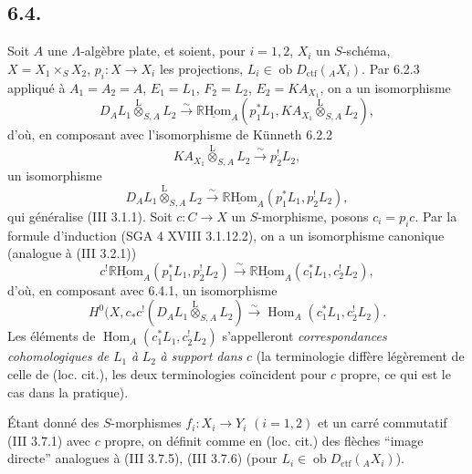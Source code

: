 \documentclass[11pt]{article}
\DeclareMathOperator{\Hom}{Hom}
\newcommand{\R}{\mathbb{R}}\newcommand{\RHomCore}{\mathbb{R}\mathrm{Hom}}
\providecommand{\RHom}{\RHomCore}
\providecommand{\uRHom}{\underline{\RHom}}
\providecommand{\lten}{\overset{\mathrm L}{\otimes}}
\providecommand{\Ob}{\operatorname{ob}}
\providecommand{\RHom}{\RHomCore}
\providecommand{\Hom}{\operatorname{Hom}}
\providecommand{\lten}{\overset{\mathrm L}{\otimes}}
\providecommand{\RHom}{\R\mathcal{H}om}
\providecommand{\lten}{\overset{\mathrm L}{\otimes}}
\providecommand{\Ob}{\operatorname{ob}}
\providecommand{\R}{\mathrm R}
\providecommand{\lten}{\overset{\mathrm L}{\otimes}}
\providecommand{\lten}{\overset{\mathrm L}{\otimes}}
\providecommand{\Ob}{\operatorname{Ob}}
\providecommand{\lten}{\overset{\mathrm L}{\otimes}}
\providecommand{\RHom}{\RHomCore}
\providecommand{\Hom}{\operatorname{Hom}}
\providecommand{\Ob}{\operatorname{ob}}
\providecommand{\Ob}{\operatorname{Ob}}
\providecommand{\lten}{\overset{\mathrm L}{\otimes}}
\begin{document}
\subsection*{6.4.}
Soit $A$ une $\Lambda$-algèbre plate, et soient, pour $i=1,2$, $X_i$ un $S$-schéma, $X=X_1\times_SX_2$, $p_i:X\to X_i$ les projections, $L_i\in\Ob D_{\mathrm{ctf}}({}_AX_i)$. Par 6.2.3 appliqué à $A_1=A_2=A$, $E_1=L_1$, $F_2=L_2$, $E_2=KA_{X_1}$, on a un isomorphisme
\[
D_A L_1\lten_{S,A}L_2
\xrightarrow{\sim}
\uRHom_A(p_1^*L_1,KA_{X_1}\lten_{S,A}L_2),
\]
d'où, en composant avec l'isomorphisme de Künneth 6.2.2
\[
KA_{X_1}\lten_{S,A}L_2\xrightarrow{\sim}p_2^!L_2,
\]
un isomorphisme
\begin{equation}
D_AL_1\lten_{S,A}L_2
\xrightarrow{\sim}
\uRHom_A(p_1^*L_1,p_2^!L_2),
\tag{6.4.1}
\end{equation}
qui généralise (III 3.1.1). Soit $c:C\to X$ un $S$-morphisme, posons $c_i=p_ic$. Par la formule d'induction (SGA 4 XVIII 3.1.12.2), on a un isomorphisme canonique (analogue à (III 3.2.1))
\begin{equation}
c^!\uRHom_A(p_1^*L_1,p_2^!L_2)
\xrightarrow{\sim}
\uRHom_A(c_1^*L_1,c_2^!L_2),
\tag{6.4.2}
\end{equation}
d'où, en composant avec 6.4.1, un isomorphisme
\begin{equation}
H^0(X,c_*c^!(D_AL_1\lten_{S,A}L_2)
\xrightarrow{\sim}
\Hom_A(c_1^*L_1,c_2^!L_2).
\tag{6.4.3}
\end{equation}
Les éléments de $\Hom_A(c_1^*L_1,c_2^!L_2)$ s'appelleront \emph{correspondances cohomologiques de} $L_1$ \emph{à} $L_2$ \emph{à support dans} $c$ (la terminologie diffère légèrement de celle de (loc. cit.), les deux terminologies coïncident pour $c$ propre, ce qui est le cas dans la pratique).

Étant donné des $S$-morphismes $f_i:X_i\to Y_i$ $(i=1,2)$ et un carré commutatif (III 3.7.1) avec $c$ propre, on définit comme en (loc. cit.) des flèches ``image directe'' analogues à (III 3.7.5), (III 3.7.6) (pour $L_i\in\Ob D_{\mathrm{ctf}}({}_AX_i)$).
\end{document}
